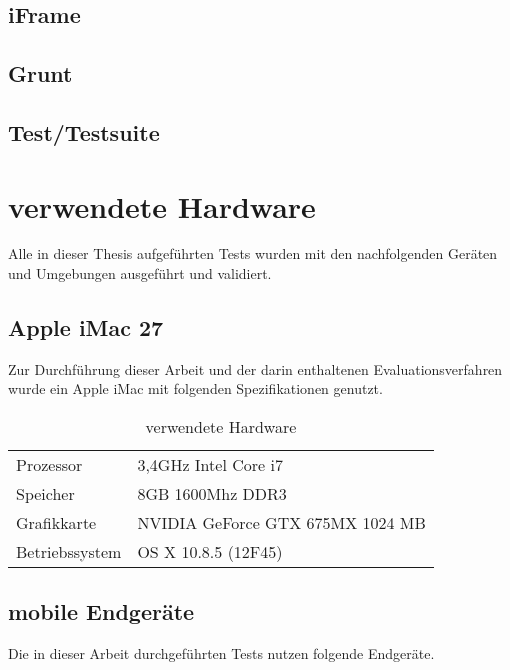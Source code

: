 		\subsection{iFrame}
		\subsection{Grunt}
		\subsection{Test/Testsuite}
	
	\pagebreak
	\section{verwendete Hardware}
	Alle in dieser Thesis aufgeführten Tests wurden mit den nachfolgenden Geräten und Umgebungen ausgeführt und validiert.
	
	\subsection{Apple iMac 27\texttt\dq}
	Zur Durchführung dieser Arbeit und der darin enthaltenen Evaluationsverfahren wurde ein Apple iMac mit folgenden 				Spezifikationen genutzt.
	
	\begin{table}[H]
	 \vspace{-20pt}
 		\centering
			\begin{tabular}{| p{4cm} | p{8cm}  |}
			\hline
				Prozessor			&	3,4GHz Intel Core i7 \\
				Speicher			&	8GB 1600Mhz DDR3\\
				Grafikkarte		&	NVIDIA GeForce GTX 675MX 1024 MB\\
				Betriebssystem		&	OS X 10.8.5 (12F45)\\

				\hline
				\end{tabular}
			\caption{verwendete Hardware}
	\end{table}

	\subsection{mobile Endgeräte}
	Die in dieser Arbeit durchgeführten Tests nutzen folgende Endgeräte. 
	
	
